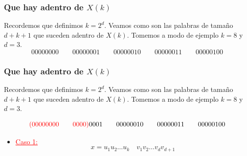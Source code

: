 \documentclass[10pt,mathserif]{beamer}%
\begin{document}
\begin{frame}
  \frametitle{Que hay adentro de $X(k)$}
  Recordemos que definimos $k = 2^d$.
  Veamos como son las palabras de tamaño $d + k + 1$ que suceden adentro de $X(k)$. Tomemos a modo de ejemplo $k = 8$ y $d = 3$.
  \pause
  $$00000000 \qquad 00000001 \qquad 00000010 \qquad 00000011 \qquad 00000100$$
  \par
\end{frame} 

\begin{frame}
  \frametitle{Que hay adentro de $X(k)$}
  Recordemos que definimos $k = 2^d$.
  Veamos como son las palabras de tamaño $d + k + 1$ que suceden adentro de $X(k)$. Tomemos a modo de ejemplo $k = 8$ y $d = 3$.

  $$\textcolor{red}{(00000000 \qquad 0000)} 0001 \qquad 00000010 \qquad 00000011 \qquad 00000100$$

    \begin{itemize}
    \item \textcolor{red}{\underline{Caso 1:}}
    $$x = u_1 u_2 \dots u_k \quad v_1 v_2 \dots v_{d} v_{d + 1}$$
    \par
  \end{itemize}
\end{frame} 
\end{document}
